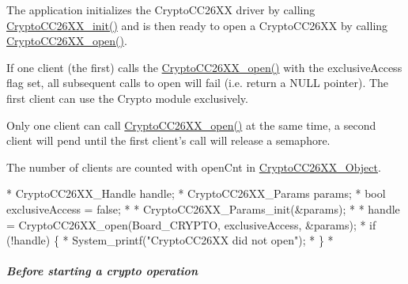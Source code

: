 \begin{DoxyItemize}
\item The application initializes the Crypto\-C\-C26\-X\-X driver by calling \hyperlink{_crypto_c_c26_x_x_8h_a512b301a6ebf10a41c86d9ff725f7749}{Crypto\-C\-C26\-X\-X\-\_\-init()} and is then ready to open a Crypto\-C\-C26\-X\-X by calling \hyperlink{_crypto_c_c26_x_x_8h_a21aa1458d0b063ee3637a40487e8ee12}{Crypto\-C\-C26\-X\-X\-\_\-open()}.
\item If one client (the first) calls the \hyperlink{_crypto_c_c26_x_x_8h_a21aa1458d0b063ee3637a40487e8ee12}{Crypto\-C\-C26\-X\-X\-\_\-open()} with the exclusive\-Access flag set, all subsequent calls to open will fail (i.\-e. return a N\-U\-L\-L pointer). The first client can use the Crypto module exclusively.
\item Only one client can call \hyperlink{_crypto_c_c26_x_x_8h_a21aa1458d0b063ee3637a40487e8ee12}{Crypto\-C\-C26\-X\-X\-\_\-open()} at the same time, a second client will pend until the first client's call will release a semaphore.
\item The number of clients are counted with open\-Cnt in \hyperlink{struct_crypto_c_c26_x_x___object}{Crypto\-C\-C26\-X\-X\-\_\-\-Object}.
\end{DoxyItemize}
\begin{DoxyCode}
*  CryptoCC26XX_Handle      handle;
*  CryptoCC26XX_Params      params;
*  \textcolor{keywordtype}{bool}                     exclusiveAccess = \textcolor{keyword}{false};
*
*  CryptoCC26XX_Params_init(&params);
*
*  handle = CryptoCC26XX_open(Board\_CRYPTO, exclusiveAccess, &params);
*  \textcolor{keywordflow}{if} (!handle) \{
*      System\_printf(\textcolor{stringliteral}{"CryptoCC26XX did not open"});
*  \}
*  
\end{DoxyCode}


\subparagraph*{Before starting a crypto operation}


